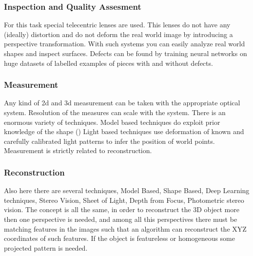 \documentclass[12pt,a4paper]{article}
\begin{document}
\subsubsection{Inspection and Quality Assesment}
For this task special telecentric lenses are used. This lenses do not have any (ideally) distortion and do not deform the real world image by introducing a perspective transformation. With such systems you can easily analyze real world shapes and inspect surfaces. Defects can be found by training neural networks on huge datasets of labelled examples of pieces with and without defects. 
\subsubsection{Measurement}
Any kind of 2d and 3d measurement can be taken with the appropriate optical system. Resolution of the measures can scale with the system. There is an enormous variety of techniques. Model based techniques do exploit prior knowledge of the shape (\cite{munoz_fast_2016}) Light based techniques use deformation of known and carefully calibrated light patterns to infer the position of world points. Measurement is strictly related to reconstruction.
\subsubsection{Reconstruction}
Also here there are several techniques, Model Based, Shape Based, Deep Learning techniques, Stereo Vision, Sheet of Light, Depth from Focus, Photometric stereo vision.
The concept is all the same, in order to reconstruct the 3D object more then one perspective is needed, and among all this perspectives there must be matching features in the images such that an algorithm can reconstruct the XYZ coordinates of such features. If the object is featureless or homogeneous some projected pattern is needed.
\end{document}
